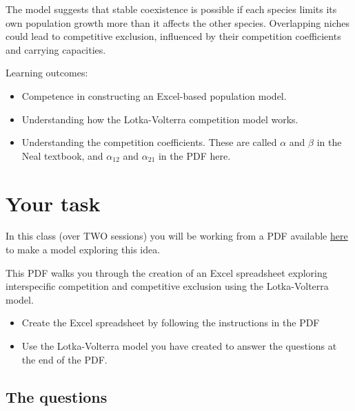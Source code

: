 \documentclass[
  a4paper]{book}
\providecommand{\tightlist}{%
  \setlength{\itemsep}{0pt}\setlength{\parskip}{0pt}}
\begin{document}
The model suggests that stable coexistence is possible if each species limits its own population growth more than it affects the other species. Overlapping niches could lead to competitive exclusion, influenced by their competition coefficients and carrying capacities.

\begin{do-something}
Learning outcomes:

\begin{itemize}
\tightlist
\item
  Competence in constructing an Excel-based population model.
\item
  Understanding how the Lotka-Volterra competition model works.
\item
  Understanding the competition coefficients. These are called
  \(\alpha\) and \(\beta\) in the Neal textbook, and \(\alpha_{12}\) and
  \(\alpha_{21}\) in the PDF here.
\end{itemize}
\end{do-something}

\hypertarget{your-task-12}{%
\section{Your task}\label{your-task-12}}

In this class (over TWO sessions) you will be working from a PDF available \href{https://www.dropbox.com/s/oukr39oq0rsn8il/9.\%20Interspecific\%20Competition\%20and\%20Competitive\%20Exclusion.pdf?dl=1}{here} to make a model exploring this idea.

This PDF walks you through the creation of an Excel spreadsheet exploring interspecific competition and competitive exclusion using the Lotka-Volterra model.

\begin{itemize}
\tightlist
\item
  Create the Excel spreadsheet by following the instructions in the PDF
\item
  Use the Lotka-Volterra model you have created to answer the questions at the end of the PDF.
\end{itemize}

\hypertarget{the-questions}{%
\subsection{The questions}\label{the-questions}}
\end{document}
